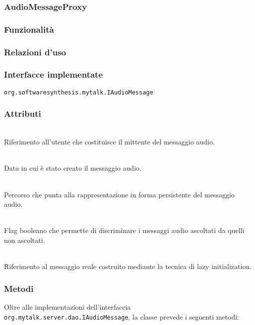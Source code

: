 \subsubsection{AudioMessageProxy}\label{sec:audiomessageproxy}

\subsubsection*{Funzionalità}

\subsubsection*{Relazioni d'uso}

\subsubsection*{Interfacce implementate}
\texttt{org.softwaresynthesis.mytalk.IAudioMessage}

\subsubsection*{Attributi}
\begin{description}
  \item{}\\
Riferimento all'utente che costituisce il mittente del messaggio audio.
  \item{}\\
Data in cui è stato creato il messaggio audio.
  \item{}\\
Percorso che punta alla rappresentazione in forma persistente del messaggio audio.
  \item{}\\
Flag booleano che permette di discriminare i messaggi audio ascoltati da quelli non ascoltati.
  \item{}\\
Riferimento al messaggio reale costruito mediante la tecnica di lazy initialization.
\end{description}

\subsubsection*{Metodi}
Oltre alle implementazioni dell'interfaccia \texttt{org.mytalk.server.dao.IAudioMessage}, la classe prevede i seguenti metodi:
\begin{description}
\item{}\\
\end{description}

